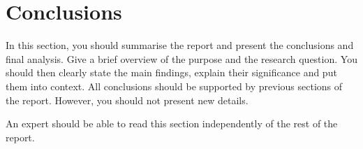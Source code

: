 \section{Conclusions}

In this section, you should summarise the report and present the conclusions and final analysis. Give a brief overview of the purpose and the research question. You should then clearly state the main findings, explain their significance and put them into context. All conclusions should be supported by previous sections of the report.  However, you should not present new details. 

An expert should be able to read this section independently of the rest of the report. 